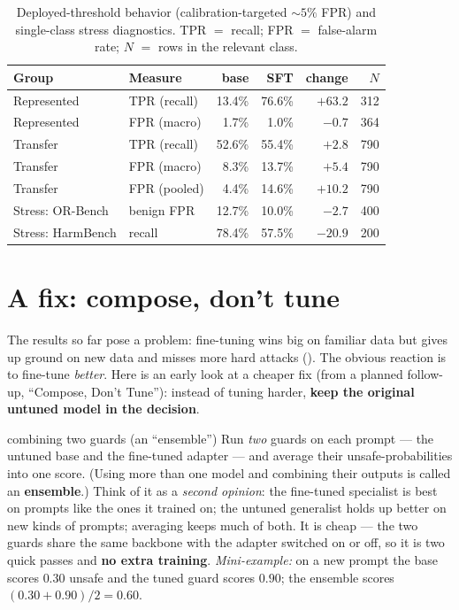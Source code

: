 \documentclass[11pt]{article}
\begin{document}
\begin{table}[t]
\centering\small
\caption{Deployed-threshold behavior (calibration-targeted ${\sim}5\%$ FPR) and single-class
stress diagnostics. TPR $=$ recall; FPR $=$ false-alarm rate; $N$ $=$ rows in the relevant class.}
\label{tab:op}
\begin{tabular}{ll rr r r}
\toprule
Group & Measure & base & SFT & change & $N$ \\
\midrule
Represented & TPR (recall) & 13.4\% & 76.6\% & $+63.2$ & 312 \\
Represented & FPR (macro)  & 1.7\%  & 1.0\%  & $-0.7$  & 364 \\
Transfer    & TPR (recall) & 52.6\% & 55.4\% & $+2.8$  & 790 \\
Transfer    & FPR (macro)  & 8.3\%  & 13.7\% & $+5.4$  & 790 \\
Transfer    & FPR (pooled) & 4.4\%  & 14.6\% & $+10.2$ & 790 \\
\midrule
Stress: OR-Bench & benign FPR & 12.7\% & 10.0\% & $-2.7$ & 400 \\
Stress: HarmBench & recall    & 78.4\% & 57.5\% & $-20.9$ & 200 \\
\bottomrule
\end{tabular}
\end{table}

\section{A fix: compose, don't tune}
\label{sec:fix}
The results so far pose a problem: fine-tuning wins big on familiar data but gives up ground
on new data and misses more hard attacks (). The obvious reaction is to fine-tune
\emph{better}. Here is an early look at a cheaper fix (from a planned follow-up, ``Compose,
Don't Tune''): instead of tuning harder, \textbf{keep the original untuned model in the decision}.

\begin{background}{combining two guards (an ``ensemble'')}
\small
Run \emph{two} guards on each prompt --- the untuned base and the fine-tuned adapter --- and
average their unsafe-probabilities into one score. (Using more than one model and combining
their outputs is called an \textbf{ensemble}.) Think of it as a \emph{second opinion}: the
fine-tuned specialist is best on prompts like the ones it trained on; the untuned generalist
holds up better on new kinds of prompts; averaging keeps much of both. It is cheap --- the two
guards share the same backbone with the adapter switched on or off, so it is two quick passes
and \textbf{no extra training}. \emph{Mini-example:} on a new prompt the base scores $0.30$
unsafe and the tuned guard scores $0.90$; the ensemble scores $(0.30+0.90)/2 = 0.60$.
\end{background}
\end{document}
